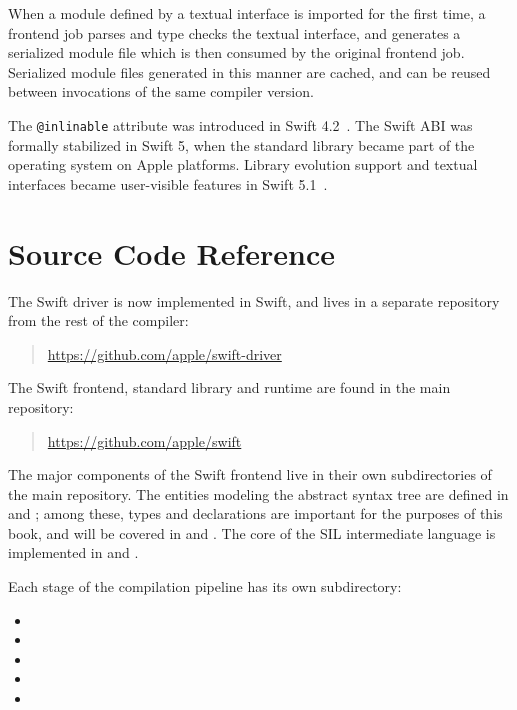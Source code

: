 \documentclass[../generics]{subfiles}
\begin{document}
When a module defined by a textual interface is imported for the first time, a frontend job parses and type checks the textual interface, and generates a serialized module file which is then consumed by the original frontend job. Serialized module files generated in this manner are cached, and can be reused between invocations of the same compiler version.

The \texttt{@inlinable} attribute was introduced in Swift 4.2~\cite{se0193}. The Swift ABI was formally stabilized in Swift 5, when the standard library became part of the operating system on Apple platforms. Library evolution support and textual interfaces became user-visible features in Swift 5.1~\cite{se0260}.

\section{Source Code Reference}\label{compilation model source reference}

The Swift driver is now implemented in Swift, and lives in a separate repository from the rest of the compiler:
\begin{quote}
\url{https://github.com/apple/swift-driver}
\end{quote}
The Swift frontend, standard library and runtime are found in the main repository:
\begin{quote}
\url{https://github.com/apple/swift}
\end{quote}
The major components of the Swift frontend live in their own subdirectories of the main repository. The entities modeling the abstract syntax tree are defined in  and ; among these, types and declarations are important for the purposes of this book, and will be covered in  and . The core of the SIL intermediate language is implemented in  and .

Each stage of the compilation pipeline has its own subdirectory:
\begin{itemize}
\item {}
\item {}
\item {}
\item {}
\item {}
\end{itemize}
\end{document}
